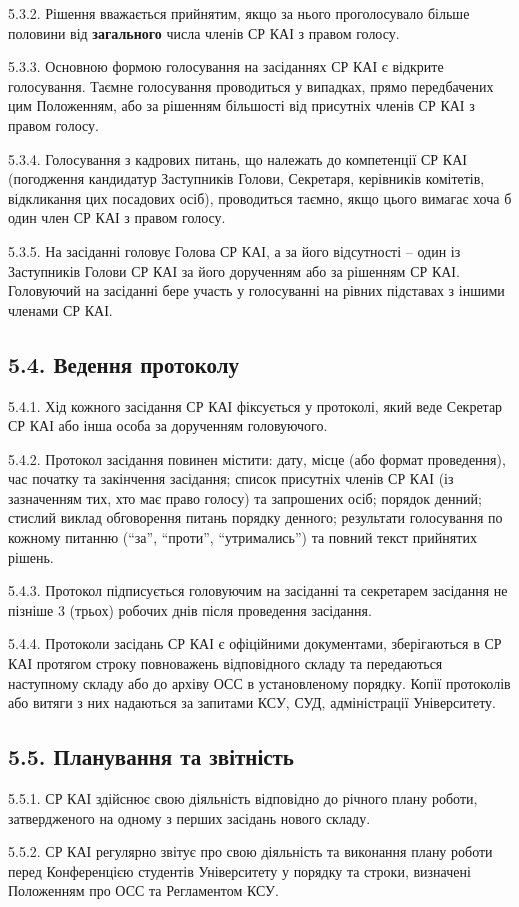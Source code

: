     5.3.2. Рішення вважається прийнятим, якщо за нього проголосувало більше половини від \textbf{загального} числа членів СР КАІ з правом голосу.

    5.3.3. Основною формою голосування на засіданнях СР КАІ є відкрите голосування. Таємне голосування проводиться у випадках, прямо передбачених цим Положенням, або за рішенням більшості від присутніх членів СР КАІ з правом голосу.

    5.3.4. Голосування з кадрових питань, що належать до компетенції СР КАІ (погодження кандидатур Заступників Голови, Секретаря, керівників комітетів, відкликання цих посадових осіб), проводиться таємно, якщо цього вимагає хоча б один член СР КАІ з правом голосу.

    5.3.5. На засіданні головує Голова СР КАІ, а за його відсутності – один із Заступників Голови СР КАІ за його дорученням або за рішенням СР КАІ. Головуючий на засіданні бере участь у голосуванні на рівних підставах з іншими членами СР КАІ.

\subsection*{5.4. Ведення протоколу}
    5.4.1. Хід кожного засідання СР КАІ фіксується у протоколі, який веде Секретар СР КАІ або інша особа за дорученням головуючого.

    5.4.2. Протокол засідання повинен містити: дату, місце (або формат проведення), час початку та закінчення засідання; список присутніх членів СР КАІ (із зазначенням тих, хто має право голосу) та запрошених осіб; порядок денний; стислий виклад обговорення питань порядку денного; результати голосування по кожному питанню (``за'', ``проти'', ``утримались'') та повний текст прийнятих рішень.

    5.4.3. Протокол підписується головуючим на засіданні та секретарем засідання не пізніше 3 (трьох) робочих днів після проведення засідання.

    5.4.4. Протоколи засідань СР КАІ є офіційними документами, зберігаються в СР КАІ протягом строку повноважень відповідного складу та передаються наступному складу або до архіву ОСС в установленому порядку. Копії протоколів або витяги з них надаються за запитами КСУ, СУД, адміністрації Університету.

\subsection*{5.5. Планування та звітність}
    5.5.1. СР КАІ здійснює свою діяльність відповідно до річного плану роботи, затвердженого на одному з перших засідань нового складу.

    5.5.2. СР КАІ регулярно звітує про свою діяльність та виконання плану роботи перед Конференцією студентів Університету у порядку та строки, визначені Положенням про ОСС та Регламентом КСУ. 